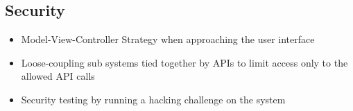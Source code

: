 	\subsection{Security}
		\begin{itemize}
			\item Model-View-Controller Strategy when approaching the user interface
			\item Loose-coupling sub systems tied together by APIs to limit access only to the allowed API calls
			\item Security testing by running a hacking challenge on the system
		\end{itemize}